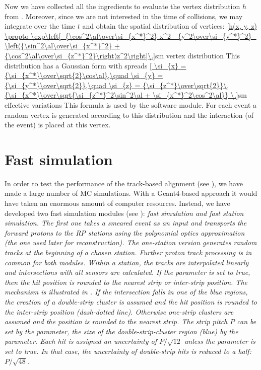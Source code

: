 Now we have collected all the ingredients to evaluate the vertex distribution $h$ from . Moreover, since we are not interested in the time of collisions, we may integrate over the time $t$ and obtain the spatial distribution of vertices:
\eqref{h(x, y, z) \propto \exp\left[- {\cos^2\al\over\si_{x^*}^2} x^2 - {y^2\over\si_{y^*}^2} - \left({\sin^2\al\over\si_{x^*}^2} + {\cos^2\al\over\si_{z^*}^2}\right)z^2\right]\.}{sm vertex distribution}
This distribution has a Gaussian form with spreads
\eqref{
	\si_{x} = {\si_{x^*}\over\sqrt{2}\cos\al},\quad
	\si_{y} = {\si_{y^*}\over\sqrt{2}},\quad
	\si_{z} = {\si_{z^*}\over\sqrt{2}}\,{\si_{x^*}\over\sqrt{\si_{z^*}^2\sin^2\al + \si_{x^*}^2\cos^2\al}} \.}{sm effective variations}
This formula is used by the software module. For each event a random vertex is generated according to this distribution and the interaction (of the event) is placed at this vertex.


\section[fast simu]{Fast simulation}

In order to test the performance of the track-based alignment (see ), we have made a large number of MC simulations. With a Geant4-based approach it would have taken an enormous amount of computer resources. Instead, we have developed two fast simulation modules (see ): \em{fast simulation} and \em{fast station simulation}. The first one takes a smeared event as an input and transports the forward protons to the RP stations using the polynomial optics approximation (the one used later for reconstruction). The one-station version generates random tracks at the beginning of a chosen station. Further proton track processing is in common for both modules. Within a station, the tracks are interpolated linearly and intersections with all sensors are calculated. If the  parameter is set to true, then the hit position is rounded to the nearest strip or inter-strip position. The mechanism is illustrated in . If the intersection falls in one of the blue regions, the creation of a double-strip cluster is assumed and the hit position is rounded to the inter-strip position (dash-dotted line). Otherwise one-strip clusters are assumed and the position is rounded to the nearest strip. The strip pitch $P$ can be set by the  parameter, the size of the double-strip-cluster region (blue) by the  parameter. Each hit is assigned an uncertainty of $P/\sqrt{12}$ unless the  parameter is set to true. In that case, the uncertainty of double-strip hits is reduced to a half: $P/\sqrt{48}$.

